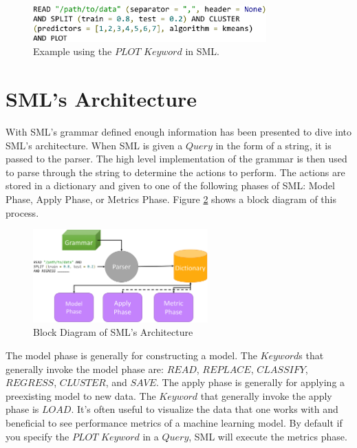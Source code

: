 \documentclass[jair,twoside,11pt,theapa]{article}
\begin{document}
\begin{figure}
\includegraphics[width=0.8\textwidth]{figs/PLOT.png}
\centering
\caption{Example using the \(PLOT\) \(Keyword\) in SML.}
\label{fig:SML:PLOT}
\end{figure}

\section{SML's Architecture}
\label{sml-architecture}

With SML's grammar defined enough information has been presented to dive into SML's architecture. When SML is given a \(Query\) in the form of a string, it is passed to the parser. The high level implementation of the grammar is then used to parse through the string to determine the actions to perform. The actions are stored in a dictionary and given to one of the following phases of SML: Model Phase, Apply Phase, or Metrics Phase. Figure \ref{fig:SML:Architecture} shows a block diagram of this process.

\begin{figure}
\includegraphics[width=0.6\textwidth]{figs/architecture.png}
\centering
\caption{Block Diagram of SML's Architecture}
\label{fig:SML:Architecture}
\end{figure}

The model phase is generally for constructing a model. The \(Keyword\)s that generally invoke the model phase are: \(READ\), \(REPLACE\), \(CLASSIFY\), \(REGRESS\), \(CLUSTER\), and \(SAVE\). The apply phase is generally for applying a preexisting model  to new data. The \(Keyword\) that generally invoke the apply phase is \(LOAD\). It's often useful to visualize the data that one works with and beneficial to see performance metrics of a machine learning model. By default if you specify the \(PLOT\) \(Keyword\) in a \(Query\), SML will execute the metrics phase.
\end{document}
